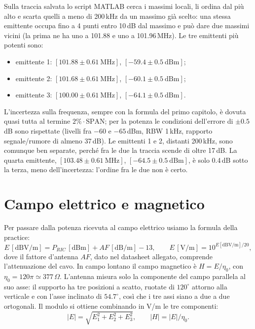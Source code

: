 \documentclass[11pt,a4paper,oneside]{book}
\begin{document}
Sulla traccia salvata lo script MATLAB cerca i massimi locali, li ordina dal più alto e scarta quelli a meno di 200\,kHz da un massimo già scelto: una stessa emittente occupa fino a 4 punti entro 10\,dB dal massimo e può dare due massimi vicini (la prima ne ha uno a 101.88 e uno a 101.96\,MHz). Le tre emittenti più potenti sono:
\begin{itemize}
\item emittente 1: $[101.88 \pm 0.61\ \mathrm{MHz}]$, $[-59.4 \pm 0.5\ \mathrm{dBm}]$;
\item emittente 2: $[101.68 \pm 0.61\ \mathrm{MHz}]$, $[-60.1 \pm 0.5\ \mathrm{dBm}]$;
\item emittente 3: $[100.00 \pm 0.61\ \mathrm{MHz}]$, $[-64.1 \pm 0.5\ \mathrm{dBm}]$.
\end{itemize}
L'incertezza sulla frequenza, sempre con la formula del primo capitolo, è dovuta quasi tutta al termine $2\%\cdot\mathrm{SPAN}$; per la potenza le condizioni dell'errore di $\pm 0.5$\,dB sono rispettate (livelli fra $-60$ e $-65$\,dBm, RBW 1\,kHz, rapporto segnale/rumore di almeno 37\,dB). Le emittenti 1 e 2, distanti 200\,kHz, sono comunque ben separate, perché fra le due la traccia scende di oltre 17\,dB. La quarta emittente, $[103.48 \pm 0.61\ \mathrm{MHz}]$, $[-64.5 \pm 0.5\ \mathrm{dBm}]$, è solo 0.4\,dB sotto la terza, meno dell'incertezza: l'ordine fra le due non è certo.

\setcounter{section}{3}%
\section{Campo elettrico e magnetico}
\label{sec:5_4}
Per passare dalla potenza ricevuta al campo elettrico usiamo la formula della practice:
\begin{equation}
E\,[\mathrm{dBV/m}] = P_{RIC}\,[\mathrm{dBm}] + AF\,[\mathrm{dB/m}] - 13,
\qquad E\,[\mathrm{V/m}] = 10^{E[\mathrm{dBV/m}]/20},
\label{eq:5_campo}
\end{equation}
dove il fattore d'antenna $AF$, dato nel datasheet allegato, comprende l'attenuazione del cavo. In campo lontano il campo magnetico è $H = E/\eta_0$, con $\eta_0 = 120\pi \simeq 377\,\Omega$. L'antenna misura solo la componente del campo parallela al suo asse: il supporto ha tre posizioni a scatto, ruotate di $120^\circ$ attorno alla verticale e con l'asse inclinato di $54.7^\circ$, così che i tre assi siano a due a due ortogonali. Il modulo si ottiene combinando in V/m le tre componenti:
\begin{equation}
|E| = \sqrt{E_1^2 + E_2^2 + E_3^2}, \qquad |H| = |E|/\eta_0 .
\label{eq:5_modulo}
\end{equation}
\end{document}
